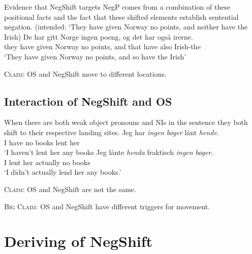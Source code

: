 \documentclass[12pt, letterpaper]{article}
\begin{document}
\ex Evidence that NegShift targets NegP comes from a combination of these positional facts and the fact that these shifted elements establish sentential negation.
	\glt (intended: ‘They have given Norway no points, and neither have the Irish) \label{ex:NEITHER}
	\ex 
	\gll De har gitt Norge ingen poeng, og det har også irerne.\\
	they have given Norway no points, and that have also Irish-the\\
	\glt `They have given Norway no points, and so have the Irish'
	\z 
\z

\begin{tcolorbox}[width=\linewidth]
\textsc{Claim}: OS and NegShift move to different locations.
\end{tcolorbox}

\subsection{Interaction of NegShift and OS} \label{sec:NEG-OS}
\ea When there are both weak object pronouns and NIs in the sentence they both shift to their respective landing sites. 
	\ea \label{ex:NegShift}
	\gll Jeg har \emph{ingen} \emph{bøger} lånt \emph{hende}.\\
	I have no books lent her\\
	\glt `I haven't lent her any books
	\ex \label{ex:NegOS}
	\gll Jeg lånte \textit{henda} fraktisch \textit{ingen} \textit{bøger}.\\
	I lent her actually no books\\
	\glt `I didn't actually lend her any books.'
	\z 

\z

\begin{tcolorbox}[width=\linewidth]
\textsc{Claim:} OS and NegShift are not the same.

\textsc{Big Claim:} OS and NegShift have different triggers for movement. 
\end{tcolorbox}


\section{Deriving of NegShift} \label{sec:ZEIJLSTRA}
\end{document}
